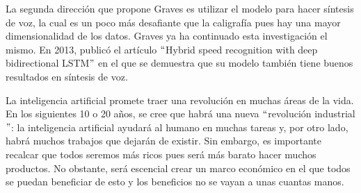 \vspace{1em}

La segunda dirección que propone Graves es utilizar el modelo para hacer síntesis de voz, la cual es un poco más desafiante que la caligrafía pues hay una mayor dimensionalidad de los datos. Graves ya ha continuado esta investigación el mismo. En 2013, publicó el artículo $``$Hybrid speed recognition with deep bidirectional LSTM$"$ en el que se demuestra que su modelo también tiene buenos resultados en síntesis de voz.
\cite{DBLP:journals/corr/Graves13}

\vspace{1em}

La inteligencia artificial promete traer una revolución en muchas áreas de la vida. En los siguientes 10 o 20 años, se cree que habrá una nueva $``$revolución industrial$"$: la inteligencia artificial ayudará al humano en muchas tareas y, por otro lado, habrá muchos trabajos que dejarán de existir. Sin embargo, es importante recalcar que todos seremos más ricos pues será más barato hacer muchos productos. No obstante, será escencial crear un marco económico en el que todos se puedan beneficiar de esto y los beneficios no se vayan a unas cuantas manos. 
\cite{goodfellow-et-al-2016}

